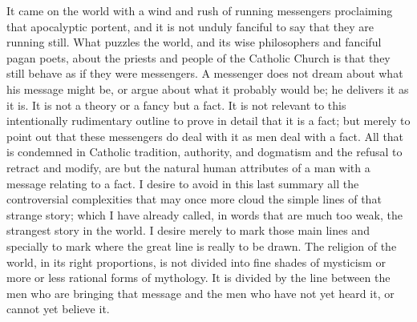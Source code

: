 It came on the world with a wind and rush of running messengers proclaiming that apocalyptic portent, and it is not unduly fanciful to say that they are running still. What puzzles the world, and its wise philosophers and fanciful pagan poets, about the priests and people of the Catholic Church is that they still behave as if they were messengers. A messenger does not dream about what his message might be, or argue about what it probably would be; he delivers it as it is. It is not a theory or a fancy but a fact. It is not relevant to this intentionally rudimentary outline to prove in detail that it is a fact; but merely to point out that these messengers do deal with it as men deal with a fact. All that is condemned in Catholic tradition, authority, and dogmatism and the refusal to retract and modify, are but the natural human attributes of a man with a message relating to a fact. I desire to avoid in this last summary all the controversial complexities that may once more cloud the simple lines of that strange story; which I have already called, in words that are much too weak, the strangest story in the world. I desire merely to mark those main lines and specially to mark where the great line is really to be drawn. The religion of the world, in its right proportions, is not divided into fine shades of mysticism or more or less rational forms of mythology. It is divided by the line between the men who are bringing that message and the men who have not yet heard it, or cannot yet believe it.


